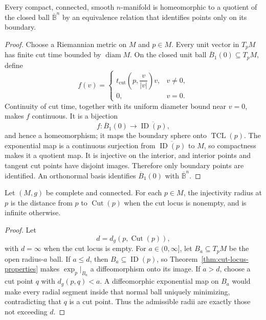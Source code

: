 \begin{corollary}
\label{cor:compact-manifold-quotient}

Every compact, connected, smooth $n$-manifold is homeomorphic to a quotient of
the closed ball $\overline{\mathbb B}^n$ by an equivalence relation that
identifies points only on its boundary.

\begin{proof}
\sketch Choose a Riemannian metric on $M$ and $p\in M$. Every unit vector in
$T_pM$ has finite cut time bounded by $\operatorname{diam}M$. On the closed
unit ball $\overline B_1(0)\subseteq T_pM$, define
\[
f(v)=
\begin{cases}
t_{\mathrm{cut}}\left(p,\dfrac v{|v|}\right)v,&v\ne0,\\[2mm]
0,&v=0.
\end{cases}
\]
Continuity of cut time, together with its uniform diameter bound near $v=0$,
makes $f$ continuous. It is a bijection
\[
f\colon\overline B_1(0)\longrightarrow
\overline{\operatorname{ID}(p)},
\]
and hence a homeomorphism; it maps the boundary sphere onto
$\operatorname{TCL}(p)$. The exponential map is a continuous surjection from
$\overline{\operatorname{ID}(p)}$ to $M$, so compactness makes it a quotient
map. It is injective on the interior, and interior points and tangent cut points
have disjoint images. Therefore only boundary points are identified. An
orthonormal basis identifies $\overline B_1(0)$ with
$\overline{\mathbb B}^n$.
\end{proof}
\end{corollary}

\begin{proposition}
\label{prop:injectivity-radius-cut-locus}

Let $(M,g)$ be complete and connected. For each $p\in M$, the injectivity
radius at $p$ is the distance from $p$ to $\operatorname{Cut}(p)$ when the cut
locus is nonempty, and is infinite otherwise.

\begin{proof}
\sketch Let
\[
d=d_g(p,\operatorname{Cut}(p)),
\]
with $d=\infty$ when the cut locus is empty. For
$a\in(0,\infty]$, let $B_a\subseteq T_pM$ be the open radius-$a$ ball. If
$a\leq d$, then $B_a\subseteq\operatorname{ID}(p)$, so
Theorem~\ref{thm:cut-locus-properties} makes $\exp_p|_{B_a}$ a diffeomorphism
onto its image. If $a>d$, choose a cut point $q$ with $d_g(p,q)<a$. A
diffeomorphic exponential map on $B_a$ would make every radial segment inside
that normal ball uniquely minimizing, contradicting that $q$ is a cut point.
Thus the admissible radii are exactly those not exceeding $d$.
\end{proof}
\end{proposition}

